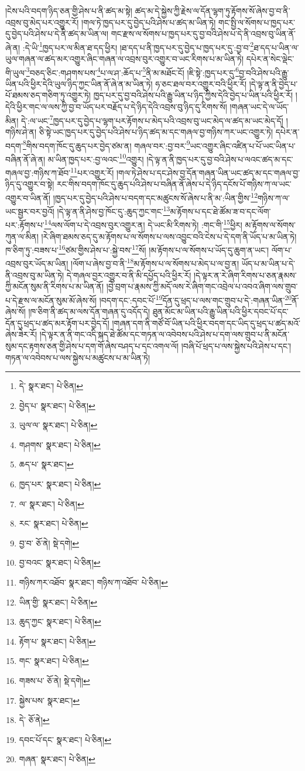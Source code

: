 །ངེས་པའི་བདག་ཉིད་ཅན་གྱི་ཤེས་པ་ནི་ཚད་མ་སྟེ། ཚད་མ་དེ་སྐྱེས་ཀྱི་རྗེས་ལ་དོན་ལྷག་ཏུ་རྟོགས་སོ་ཞེས་བྱ་བ་ནི་འབྲས་བུ་མེད་པར་འགྱུར་རོ། །གལ་ཏེ་ཁྱད་པར་དུ་བྱེད་པའི་ཤེས་པ་ཚད་མ་ཡིན་ཏེ། གང་སྤྱི་ལ་སོགས་པ་ཁྱད་པར་དུ་བྱེད་པའི་ཤེས་པ་དེ་ནི་ཚད་མ་ཡིན་ལ། གང་རྫས་ལ་སོགས་པ་ཁྱད་པར་དུ་བྱ་བའི་ཤེས་པ་དེ་ནི་འབྲས་བུ་ཡིན་ནོ་ཞེ་ན། :དེ་ཡི་\footnote{དེ་  སྣར་ཐང་།  པེ་ཅིན། }ཁྱད་པར་ལ་མིན་ཐ་དད་ཕྱིར། །ཐ་དད་པ་ནི་ཁྱད་པར་དུ་བྱེད་པ་ཁྱད་པར་དུ་:བྱ་བ་\footnote{བྱེད་པ་  སྣར་ཐང་།  པེ་ཅིན། }ཐ་དད་པ་ཡིན་ལ་ཡུལ་གཞན་ལ་ཚད་མར་འགྱུར་ཞིང་གཞན་ལ་འབྲས་བུར་འགྱུར་བ་ཡང་རིགས་པ་མ་ཡིན་ཏེ། དཔེར་ན་སེང་ལྡེང་གི་ཡུལ་\footnote{ཡུལ་ལ་  སྣར་ཐང་།  པེ་ཅིན། }བཅད་ཅིང་:གཤགས་པས་\footnote{གཤགས་  སྣར་ཐང་།  པེ་ཅིན། }པ་ལ་ཤ་:ཆོད་པ་\footnote{ཆད་པ་  སྣར་ཐང་། }ནི་མ་མཐོང་ངོ། །ཇི་སྟེ་:ཁྱད་པར་དུ་\footnote{ཁྱད་པར་  སྣར་ཐང་།  པེ་ཅིན། }བྱ་བའི་ཤེས་པའི་རྒྱུ་ཡིན་པའི་ཕྱིར་དེའི་ཡུལ་ཉིད་ཀྱང་ཡིན་ནོ་ཞེ་ན་མ་ཡིན་ཏེ། ཧ་ཅང་ཐལ་བར་འགྱུར་བའི་ཕྱིར་རོ། །དེ་ལྟ་ན་ནི་བྱེད་པ་པོ་ཐམས་ཅད་གཅིག་ཏུ་འགྱུར་ཏེ། ཁྱད་པར་དུ་བྱ་བའི་ཤེས་པའི་རྒྱུ་ཡིན་པ་ཉིད་ཀྱིས་དེའི་བྱེད་པ་ཡིན་པའི་ཕྱིར་རོ། །དེའི་ཕྱིར་གང་ལ་ལས་ཀྱི་བྱ་བ་ཡོད་པར་བརྗོད་པ་དེ་ཉིད་དེའི་འབྲས་བུ་ཉིད་དུ་རིགས་སོ། །གཞན་ཡང་དེ་ལ་ཡོད་མིན། དེ་:ལ་ཡང་\footnote{ལ་  སྣར་ཐང་།  པེ་ཅིན། }ཁྱད་པར་དུ་བྱེད་པ་ལྷག་པར་རྟོགས་པ་མེད་པའི་འབྲས་བུ་ཡང་མེད་ལ་ཚད་མ་ཡང་མེད་དོ། །གཉིས་ཤེ་ན། ཅི་སྟེ་ཡང་ཁྱད་པར་དུ་བྱེད་པའི་ཤེས་པ་ཉིད་ཚད་མ་དང་གཞལ་བྱ་གཉིས་ཀར་ཡང་འགྱུར་ཏེ། དཔེར་ན་བདག་\footnote{རང་  སྣར་ཐང་།  པེ་ཅིན། }གིས་བདག་ཁོང་དུ་ཆུད་པར་བྱེད་ཙམ་ན། གཞལ་བར་:བྱ་བར་\footnote{བྱ་བ་  ཅོ་ནེ།  སྡེ་དགེ། }ཡང་འགྱུར་ཞིང་འཛིན་པ་པོ་ཡང་ཡིན་པ་བཞིན་ནོ་ཞེ་ན། མ་ཡིན་ཁྱད་པར་:བྱ་ལའང་\footnote{བྱ་བའང་  སྣར་ཐང་།  པེ་ཅིན། }འགྱུར། །དེ་ལྟ་ན་ནི་ཁྱད་པར་དུ་བྱ་བའི་ཤེས་པ་ལའང་ཚད་མ་དང་གཞལ་བྱ་:གཉིས་ཀ་ཐོབ་\footnote{གཉིས་ཀར་འཐོབ་  སྣར་ཐང་། གཉིས་ཀ་འཐོབ་  པེ་ཅིན། }པར་འགྱུར་རོ། །གལ་ཏེ་ཤེས་པ་དང་ཤེས་བྱ་དོན་གཞན་ཡིན་ཡང་ཚད་མ་དང་གཞལ་བྱ་ཉིད་དུ་འགྱུར་བ་སྟེ། རང་གིས་བདག་ཁོང་དུ་ཆུད་པའི་ཤེས་པ་བཞིན་ནོ་ཞེས་པ་དེ་ཉིད་དངོས་པོ་གཉིས་ཀ་ལ་ཡང་འགྱུར་བ་ཡིན་ནོ། །ཁྱད་པར་དུ་བྱེད་པའི་ཤེས་པ་བདག་དང་མཚུངས་སོ་ཞེས་པ་ནི་མ་:ཡིན་གྱིས་\footnote{ཡིན་གྱི་  སྣར་ཐང་།  པེ་ཅིན། }གཉིས་ཀ་ལ་ཡང་སྦྱར་བར་བྱའོ། །དེ་ལྟ་ན་ནི་ཤེས་བྱ་ཁོང་དུ་:ཆུད་ཀྱང་གང་\footnote{ཆུད་ཀྱང་  སྣར་ཐང་།  པེ་ཅིན། }མ་རྟོགས་པ་དང་ཐེ་ཚོམ་ཟ་བ་དང་ལོག་པར་:རྟོགས་པ་\footnote{རྟོག་པ་  སྣར་ཐང་།  པེ་ཅིན། }ལས་ལོག་པ་དེ་འབྲས་བུར་འགྱུར་ན། དེ་ཡང་མི་རིགས་ཏེ། :གང་གི་\footnote{གང་  སྣར་ཐང་།  པེ་ཅིན། }ཕྱིར། མ་རྟོགས་ལ་སོགས་ཀུན་ལ་མིན། །རེ་ཞིག་ཐམས་ཅད་དུ་མ་རྟོགས་པ་ལ་སོགས་པ་ལས་འབྱུང་བའི་ངེས་པ་དེ་དག་ནི་ཡོད་པ་མ་ཡིན་ཏེ། ཁ་ཅིག་ཏུ་:བཟས་པ་\footnote{གཟས་པ་  ཅོ་ནེ།  སྡེ་དགེ། }ཙམ་གྱིས་ཤེས་པ་:སྐྱེ་བས་\footnote{སྐྱེས་པས་  སྣར་ཐང་། }སོ། །མ་རྟོགས་པ་ལ་སོགས་པ་ཡོད་དུ་ཆུག་ན་ཡང་། ལོག་པ་འབྲས་བུར་ཡོད་མ་ཡིན། །ལོག་པ་ཞེས་བྱ་བ་ནི་\footnote{དེ་  ཅོ་ནེ། }མ་རྟོགས་པ་ལ་སོགས་པ་མེད་པ་ལ་བྱ་ན། ཡོད་པ་མ་ཡིན་པ་དེ་ནི་འབྲས་བུ་མ་ཡིན་ཏེ། དེ་གཞལ་བྱར་འགྱུར་བ་ནི་མི་དཔྱོད་པའི་ཕྱིར་རོ། །དེ་ལྟར་ན་རེ་ཞིག་རིགས་པ་ཅན་རྣམས་ཀྱི་མངོན་སུམ་ནི་རིགས་པ་མ་ཡིན་ནོ། །བྱེ་བྲག་པ་རྣམས་ཀྱི་མདོ་ལས་རེ་ཞིག་གང་འབྲེལ་པ་འབའ་ཞིག་ལས་གྲུབ་པ་དེ་རྫས་ལ་མངོན་སུམ་མོ་ཞེས་སོ། །བདག་དང་:དབང་པོ་\footnote{དབང་པོ་དང་  སྣར་ཐང་།  པེ་ཅིན། }དོན་དུ་ཕྲད་པ་ལས་གང་གྲུབ་པ་དེ་:གཞན་ཡིན་\footnote{གཞན་  སྣར་ཐང་།  པེ་ཅིན། }ནོ་ཞེས་སོ། །ཁ་ཅིག་ནི་ཚད་མ་ལས་དོན་གཞན་དུ་འདོད་དེ། ཐུན་མོང་མ་ཡིན་པའི་རྒྱུ་ཡིན་པའི་ཕྱིར་དབང་པོ་དང་དོན་དུ་ཕྲད་པ་ཚད་མར་རྟོག་པར་བྱེད་དོ། །གཞན་དག་ནི་གཙོ་བོ་ཡིན་པའི་ཕྱིར་བདག་དང་ཡིད་དུ་ཕྲད་པ་ཚད་མའོ་ཞེས་ཟེར་རོ། །དེ་ལྟར་ན་ནི་གང་འདི་སྐད་ཐེ་ཚོམ་དང་གཏན་ལ་འབེབས་པའི་ཤེས་པ་དག་ལས་གྲུབ་པ་ནི་མངོན་སུམ་དང་རྟགས་ཅན་གྱི་ཤེས་པ་དག་གོ་ཞེས་བཤད་པ་དང་འགལ་ལོ། །བཞི་པོ་ཕྲད་པ་ལས་སྐྱེས་པའི་ཤེས་པ་དང་། གཏན་ལ་འབེབས་པ་ལས་སྐྱེས་པ་མཚུངས་པ་མ་ཡིན་ཏེ། 